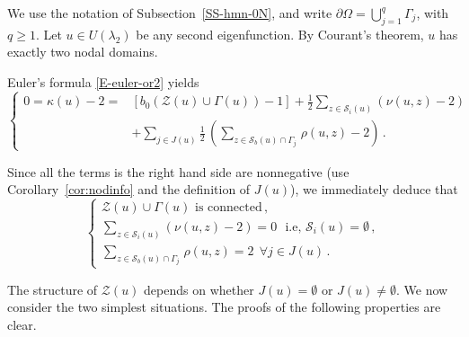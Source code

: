 \documentclass[12pt,a4paper]{amsart}
\theoremstyle{plain} %
\theoremstyle{definition}
\numberwithin{equation}{section}
\numberwithin{figure}{section}
\numberwithin{table}{section}
\newcommand{\cS}{\mathcal{S}}
\newcommand{\cZ}{\mathcal{Z}}
\begin{document}
 We use the notation of Subsection~\ref{SS-hmn-0N}, and write $\partial \Omega = \bigcup_{j=1}^q \Gamma_j$, with $q \ge 1$. Let $u \in U(\lambda_2)$ be any second eigenfunction. By Courant's theorem, $u$ has exactly two nodal domains. {Euler's formula \eqref{E-euler-or2}  yields
%
\begin{equation}\label{E-hmn0-22}
\left\{
\begin{array}{ll}
0 = \kappa(u) - 2 = & \left[ b_0(\cZ(u) \cup \Gamma(u)) - 1 \right]  + \frac 12
\sum_{z \in \cS_i(u)} (\nu(u,z)-2)\\[5pt]
& + \sum_{j \in J(u)}\frac 12 \, \left( \sum_{z\in \cS_b(u) \cap \Gamma_j\,} \rho(u,z) - 2\right)\,.
\end{array}%
\right.
\end{equation}

 Since all the terms is the right hand side are nonnegative (use Corollary~\ref{cor:nodinfo} and the definition of $J(u)$), we immediately deduce that
%
\begin{equation}\label{E-hmn0-24}
\left\{
\begin{array}{l}
\cZ(u) \cup \Gamma(u) \text{~is connected}\,,\\[5pt]
\sum_{z \in \cS_i(u)} (\nu(u,z)-2) = 0 \text{~~i.e,~} \cS_i(u) = \emptyset\,,\\[5pt]
\sum_{z\in \cS_b(u) \cap \Gamma_j\,} \rho(u,z) = 2 ~~\forall j \in J(u)\,.
\end{array}%
\right.
\end{equation}

 The structure of $\cZ(u)$ depends on whether $J(u) = \emptyset$ or $J(u) \neq \emptyset$. We now consider the two simplest situations. The proofs of the following properties are clear.

}
\end{document}
